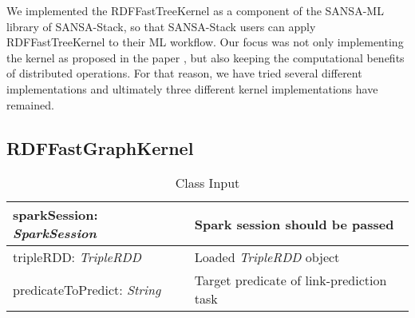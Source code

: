 \documentclass{easychair}
\begin{document}
We implemented the RDFFastTreeKernel as a component of the SANSA-ML library of SANSA-Stack, so that SANSA-Stack users can apply RDFFastTreeKernel to their ML workflow. Our focus was not only implementing the kernel as proposed in the paper \cite{FGK}, but also keeping the computational benefits of distributed operations. For that reason, we have tried several different implementations and ultimately three different kernel implementations have remained.


\subsection{RDFFastGraphKernel}
\begin{table}[]
\centering
\caption*{Class Input}
\begin{tabular}{|l|l|}
\hline
sparkSession: \textit{SparkSession} & Spark session should be passed           \\ \hline
tripleRDD: \textit{TripleRDD}       & Loaded \textit{TripleRDD} object                  \\ \hline
predicateToPredict: \textit{String} & Target predicate of link-prediction task \\ \hline
\end{tabular}
\end{table}
\end{document}
